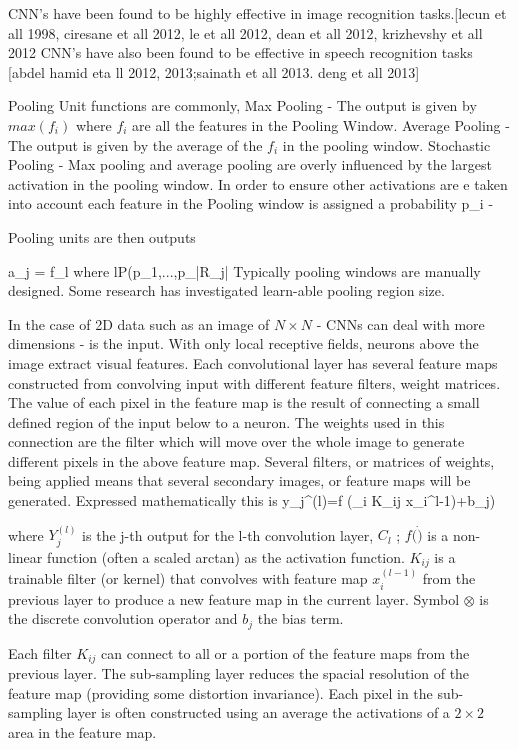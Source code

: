CNN's have been found to be highly effective in image recognition tasks\citep{dengthree}.[lecun et all 1998, ciresane et all 2012, le et all 2012, dean et all 2012, krizhevshy et all 2012
CNN's have also been found to be effective in speech recognition tasks [abdel hamid eta ll 2012, 2013;sainath et all 2013. deng et all 2013]

Pooling Unit functions are commonly,
Max Pooling  - The output is given by $max(f_i)$ where $f_i$ are all the features in the Pooling Window.
Average Pooling - The output is given by the average of the $f_i$ in the pooling window.
Stochastic Pooling - Max pooling and average pooling are overly influenced by the largest activation in the pooling window.
In order to ensure other activations are e taken into account each feature in the Pooling window is assigned a probability
\be 
p_i - 
\ee

Pooling units are then outputs 

\be
a_j = f_l where l\approx P(p_1,...,p_{|R_j|}
\ee
Typically pooling windows are manually designed.
Some research has investigated learn-able pooling region size.



In the case of 2D data such as an image of  $N\times N$ - CNNs can deal with more dimensions - is the input.
With only local receptive fields, neurons above the image extract visual features.
Each convolutional layer has several feature maps constructed from convolving input with different feature filters, weight matrices.
The value of each pixel in the feature map is the result of connecting a small defined region of the input below to a neuron.
The weights used in this connection are the filter which will move over the whole image to generate different pixels in the above feature map.
Several filters, or matrices of weights, being applied means that several secondary images, or feature maps will be generated.
Expressed mathematically this is
\be
y_j^{(l)}=f (\sum_i K_{ij} \otimes x_i^{l-1)}+b_j)
\ee

where $Y_j^{(l)}$ is the j-th output for the l-th convolution layer, $C_l$ ; $f(\dot)$ is a non-linear function (often a scaled arctan) as the activation function.
$K_{ij}$ is a trainable filter (or kernel) that convolves with feature map $x_i^{(l-1)}$ from the previous layer to produce a new feature map in the current layer.
Symbol $\otimes$ is the discrete convolution operator and $b_j$ the bias term.

Each filter $K_{ij}$ can connect to all or a portion of the feature maps from the previous layer.
The sub-sampling layer reduces the spacial resolution of the feature map (providing some distortion invariance).
Each pixel in the sub-sampling layer is often constructed using an average the activations of a $2\times2$ area in the feature map.

